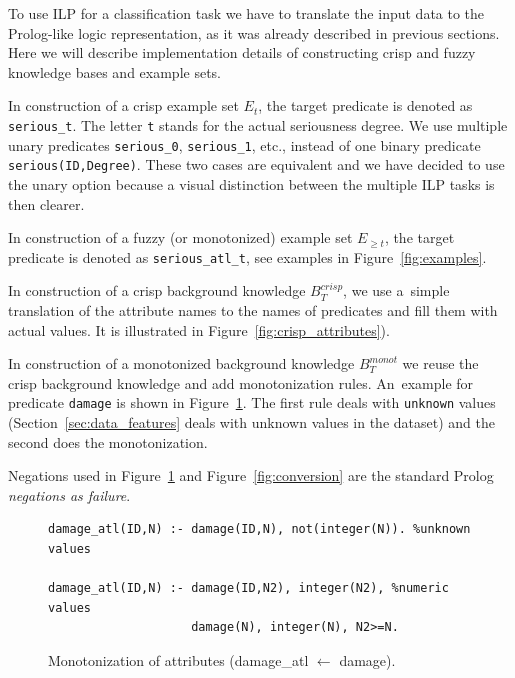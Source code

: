 To use ILP for a classification task we have to translate the input data to the Prolog-like logic representation, as it was already described in previous sections. Here we will describe implementation details of constructing crisp and fuzzy knowledge bases and example sets.

In construction of a crisp example set $E_t$, the target predicate is denoted as \texttt{serious\_t}. The letter \texttt{t} stands for the actual seriousness degree. We use multiple unary predicates \texttt{serious\_0}, \texttt{serious\_1}, etc., instead of one binary predicate \texttt{serious(ID,Degree)}. These two cases are equivalent and we have decided to use the unary option because a visual distinction between the multiple ILP tasks is then clearer.

In construction of a fuzzy (or monotonized) example set $E_{\ge t}$, the target predicate is denoted as \texttt{serious\_atl\_t}, see examples in Figure~\ref{fig:examples}.



In construction of a crisp background knowledge $B^{crisp}_{T}$, we use a~simple translation of the attribute names to the names of predicates and fill them with actual values. It is illustrated in Figure~\ref{fig:crisp_attributes}). 



In construction of a monotonized background knowledge $B^{monot}_T$ we reuse the crisp background knowledge and add monotonization rules. An~example for predicate \texttt{damage} is shown in Figure~\ref{fig:attribute_monotonization}.
The first rule deals with \texttt{unknown} values (Section~\ref{sec:data_features} deals with unknown values in the dataset) and the second does the monotonization. 

Negations used in Figure~\ref{fig:attribute_monotonization} and Figure~\ref{fig:conversion} are the standard Prolog \emph{negations as failure}.



\begin{figure}	
\begin{verbatim}
damage_atl(ID,N) :- damage(ID,N), not(integer(N)). %unknown values

damage_atl(ID,N) :- damage(ID,N2), integer(N2), %numeric values
                    damage(N), integer(N), N2>=N.
\end{verbatim}						
	\caption{Monotonization of attributes (damage\_atl $\leftarrow$ damage).}
	\label{fig:attribute_monotonization}
\end{figure}


